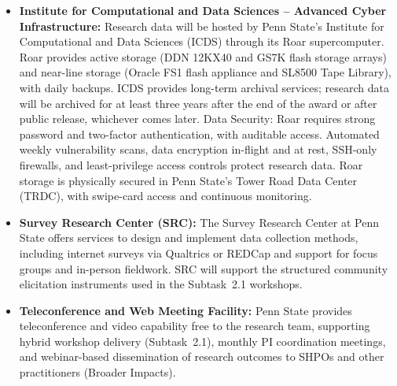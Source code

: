 \documentclass[11pt]{article}
\begin{document}
\begin{itemize}
\item \textbf{Institute for Computational and Data Sciences -- Advanced Cyber Infrastructure:}
Research data will be hosted by Penn State's Institute for Computational and Data Sciences (ICDS) through its Roar supercomputer. Roar provides active storage (DDN 12KX40 and GS7K flash storage arrays) and near-line storage (Oracle FS1 flash appliance and SL8500 Tape Library), with daily backups. ICDS provides long-term archival services; research data will be archived for at least three years after the end of the award or after public release, whichever comes later.
Data Security: Roar requires strong password and two-factor authentication, with auditable access. Automated weekly vulnerability scans, data encryption in-flight and at rest, SSH-only firewalls, and least-privilege access controls protect research data. Roar storage is physically secured in Penn State's Tower Road Data Center (TRDC), with swipe-card access and continuous monitoring.

\item \textbf{Survey Research Center (SRC):}
The Survey Research Center at Penn State offers services to design and implement data collection methods, including internet surveys via Qualtrics or REDCap and support for focus groups and in-person fieldwork. SRC will support the structured community elicitation instruments used in the Subtask~2.1 workshops.

\item \textbf{Teleconference and Web Meeting Facility:}
Penn State provides teleconference and video capability free to the research team, supporting hybrid workshop delivery (Subtask~2.1), monthly PI coordination meetings, and webinar-based dissemination of research outcomes to SHPOs and other practitioners (Broader Impacts).


\end{itemize}
\end{document}
